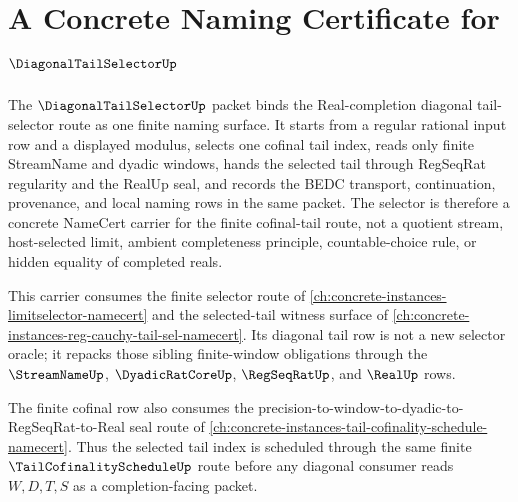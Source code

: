 \chapter{A Concrete Naming Certificate for $\DiagonalTailSelectorUp$}
\label{ch:concrete-instances-diagonal-tail-selector-namecert}

The $\DiagonalTailSelectorUp$ packet binds the Real-completion diagonal tail-selector route as one finite naming surface. It starts from a regular rational input row and a displayed modulus, selects one cofinal tail index, reads only finite StreamName and dyadic windows, hands the selected tail through RegSeqRat regularity and the RealUp seal, and records the BEDC transport, continuation, provenance, and local naming rows in the same packet. The selector is therefore a concrete NameCert carrier for the finite cofinal-tail route, not a quotient stream, host-selected limit, ambient completeness principle, countable-choice rule, or hidden equality of completed reals.

This carrier consumes the finite selector route of \autoref{ch:concrete-instances-limitselector-namecert} and the selected-tail witness surface of \autoref{ch:concrete-instances-reg-cauchy-tail-sel-namecert}. Its diagonal tail row is not a new selector oracle; it repacks those sibling finite-window obligations through the $\StreamNameUp$, $\DyadicRatCoreUp$, $\RegSeqRatUp$, and $\RealUp$ rows.

The finite cofinal row also consumes the precision-to-window-to-dyadic-to-RegSeqRat-to-Real seal route of \autoref{ch:concrete-instances-tail-cofinality-schedule-namecert}. Thus the selected tail index is scheduled through the same finite $\TailCofinalityScheduleUp$ route before any diagonal consumer reads $W,D,T,S$ as a completion-facing packet.

